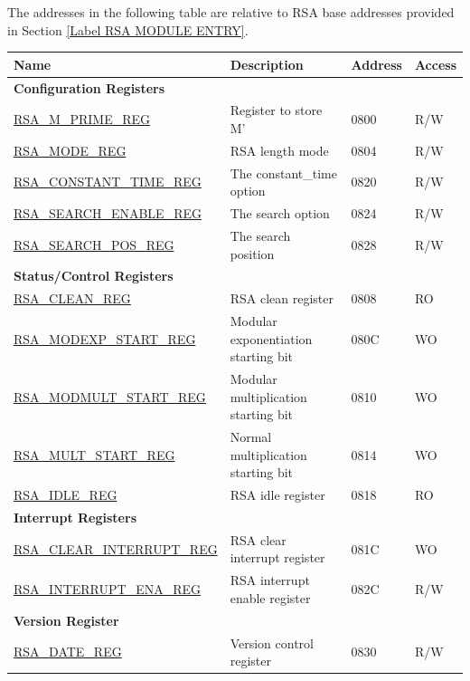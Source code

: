 The addresses in the following table are relative to RSA base addresses provided in Section \ref{Label RSA MODULE ENTRY}.

\begin{longtable}{ | p{5.2cm} | p{6.6cm} | p{2cm} | p{1.2cm} | }
\hline\rowcolor{lightgray}
Name & Description &  Address & Access \\ \hline
\multicolumn{4}{|l|}{\textbf{Configuration Registers}} \\ \hline
\hyperref[regdesc:RSAMPRIMEREG]{RSA\_M\_PRIME\_REG}                 & Register to store M' & \hexprefix{}0800 & R/W \\ \hline
\hyperref[regdesc:RSAMODEREG]{RSA\_MODE\_REG}                     & RSA length mode      & \hexprefix{}0804 & R/W \\ \hline
\hyperref[regdesc:RSACONSTANTTIMEREG]{RSA\_CONSTANT\_TIME\_REG}     & The constant\_time option & \hexprefix{}0820 & R/W \\ \hline
\hyperref[regdesc:RSASEARCHENABLEREG]{RSA\_SEARCH\_ENABLE\_REG}     & The search option        & \hexprefix{}0824 & R/W \\ \hline
\hyperref[regdesc:RSASEARCHPOSREG]{RSA\_SEARCH\_POS\_REG}           & The search position      & \hexprefix{}0828 & R/W \\ \hline
\multicolumn{4}{|l|}{\textbf{Status/Control Registers}} \\ \hline
\hyperref[regdesc:RSACLEANREG]{RSA\_CLEAN\_REG}                 & RSA clean register               & \hexprefix{}0808 & RO \\ \hline
\hyperref[regdesc:RSAMODEXPSTARTREG]{RSA\_MODEXP\_START\_REG}   & Modular exponentiation starting bit & \hexprefix{}080C & WO \\ \hline
\hyperref[regdesc:RSAMODMULTSTARTREG]{RSA\_MODMULT\_START\_REG} & Modular multiplication starting bit & \hexprefix{}0810 & WO \\ \hline
\hyperref[regdesc:RSAMULTSTARTREG]{RSA\_MULT\_START\_REG}       & Normal multiplication starting bit & \hexprefix{}0814 & WO \\ \hline
\hyperref[regdesc:RSAIDLEREG]{RSA\_IDLE\_REG}                   & RSA idle register                & \hexprefix{}0818 & RO \\ \hline
\multicolumn{4}{|l|}{\textbf{Interrupt Registers}} \\ \hline
\hyperref[regdesc:RSACLEARINTERRUPTREG]{RSA\_CLEAR\_INTERRUPT\_REG} & RSA clear interrupt register  & \hexprefix{}081C & WO  \\ \hline
\hyperref[regdesc:RSAINTERRUPTENAREG]{RSA\_INTERRUPT\_ENA\_REG}     & RSA interrupt enable register & \hexprefix{}082C & R/W \\ \hline
\multicolumn{4}{|l|}{\textbf{Version Register}} \\ \hline
\hyperref[regdesc:RSADATEREG]{RSA\_DATE\_REG}                   & Version control register     & \hexprefix{}0830 & R/W \\ \hline
\end{longtable}
